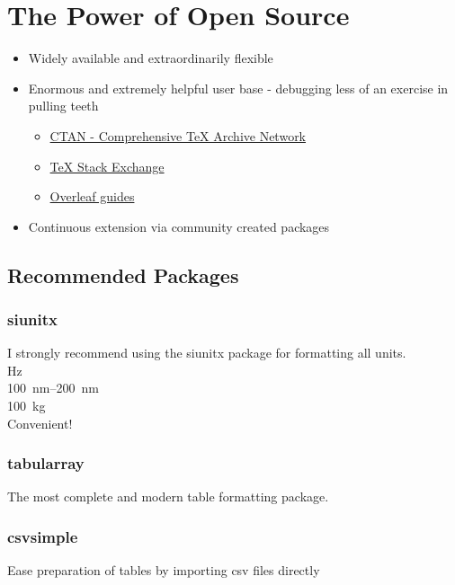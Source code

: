 \documentclass[titlepage, hidelinks, 12pt]{article}%
\begin{document}
    \section{The Power of Open Source}
        \begin{itemize}
            \item Widely available and extraordinarily flexible
            \item Enormous and extremely helpful user base - debugging less of an exercise in pulling teeth
                \begin{itemize}
                    \item \href{https://www.ctan.org/}{CTAN - Comprehensive TeX Archive Network}
                    \item \href{https://tex.stackexchange.com/}{TeX Stack Exchange}
                    \item \href{https://www.overleaf.com/learn}{Overleaf guides}
                \end{itemize}
            \item Continuous extension via community created packages
        \end{itemize}

        \subsection{Recommended Packages}
        \subsubsection{siunitx}
            I strongly recommend using the siunitx package for formatting all units.
            \\\si{\hertz}
            \\\SIrange{100}{200}{\nano\meter}
            \\\SI{100}{\kilo\gram}
            \\Convenient!

        \subsubsection{tabularray}
            The most complete and modern table formatting package.

        \subsubsection{csvsimple}
            Ease preparation of tables by importing csv files directly
\end{document}
